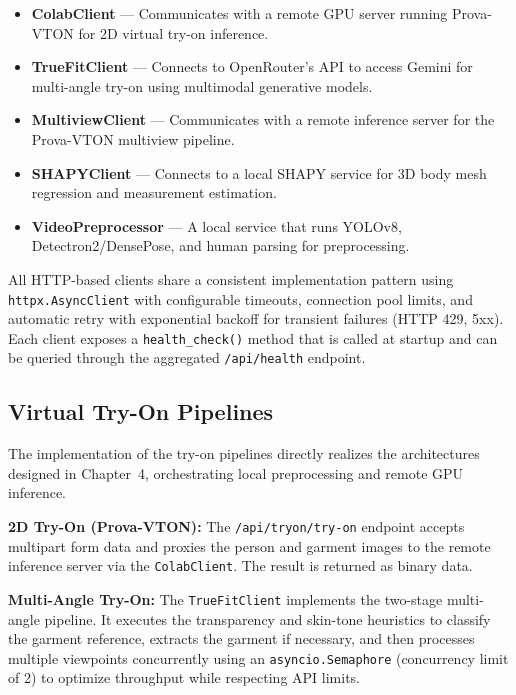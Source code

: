 \begin{itemize}[leftmargin=*]
    \item \textbf{ColabClient} --- Communicates with a remote GPU server running Prova-VTON for 2D virtual try-on inference.
    \item \textbf{TrueFitClient} --- Connects to OpenRouter's API to access Gemini for multi-angle try-on using multimodal generative models.
    \item \textbf{MultiviewClient} --- Communicates with a remote inference server for the Prova-VTON multiview pipeline.
    \item \textbf{SHAPYClient} --- Connects to a local SHAPY service for 3D body mesh regression and measurement estimation.
    \item \textbf{VideoPreprocessor} --- A local service that runs YOLOv8, Detectron2/DensePose, and human parsing for preprocessing.
\end{itemize}

All HTTP-based clients share a consistent implementation pattern using \texttt{httpx.AsyncClient} with configurable timeouts, connection pool limits, and automatic retry with exponential backoff for transient failures (HTTP 429, 5xx). Each client exposes a \texttt{health\_check()} method that is called at startup and can be queried through the aggregated \texttt{/api/health} endpoint.

\subsection{Virtual Try-On Pipelines}

The implementation of the try-on pipelines directly realizes the architectures designed in Chapter~4, orchestrating local preprocessing and remote GPU inference.

\textbf{2D Try-On (Prova-VTON):} The \texttt{/api/tryon/try-on} endpoint accepts multipart form data and proxies the person and garment images to the remote inference server via the \texttt{ColabClient}. The result is returned as binary data.

\textbf{Multi-Angle Try-On:} The \texttt{TrueFitClient} implements the two-stage multi-angle pipeline. It executes the transparency and skin-tone heuristics to classify the garment reference, extracts the garment if necessary, and then processes multiple viewpoints concurrently using an \texttt{asyncio.Semaphore} (concurrency limit of 2) to optimize throughput while respecting API limits.

